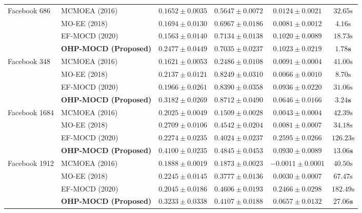 \documentclass{svproc}
\begin{document}
\begin{table}[t]
{\begin{tabular}{@{}llcccc@{}}
\midrule
Facebook 686 & MCMOEA (2016) & $0.1652 \pm 0.0035$ & $0.5647 \pm 0.0072$ & $0.0124 \pm 0.0021$ & $32.65\text{s}$ \\
 & MO-EE (2018) & $0.1694 \pm 0.0130$ & $0.6967 \pm 0.0186$ & $0.0081 \pm 0.0012$ & $4.16\text{s}$ \\
 & EF-MOCD (2020) & $0.1563 \pm 0.0140$ & $\mathbf{0.7134 \pm 0.0138}$ & $0.1020 \pm 0.0089$ & $18.73\text{s}$ \\
 & \textbf{OHP-MOCD (Proposed)} & $\mathbf{0.2477 \pm 0.0449}$ & $0.7035 \pm 0.0237$ & $\mathbf{0.1023 \pm 0.0219}$ & $\mathbf{1.78\text{s}}$ \\
\midrule
Facebook 348 & MCMOEA (2016) & $0.1621 \pm 0.0053$ & $0.2486 \pm 0.0108$ & $0.0091 \pm 0.0004$ & $41.00\text{s}$ \\
 & MO-EE (2018) & $0.2137 \pm 0.0121$ & $0.8249 \pm 0.0310$ & $0.0066 \pm 0.0010$ & $8.70\text{s}$ \\
 & EF-MOCD (2020) & $0.1966 \pm 0.0261$ & $0.8390 \pm 0.0358$ & $\mathbf{0.0936 \pm 0.0220}$ & $31.06\text{s}$ \\
 & \textbf{OHP-MOCD (Proposed)} & $\mathbf{0.3182 \pm 0.0269}$ & $\mathbf{0.8712 \pm 0.0490}$ & $0.0646 \pm 0.0166$ & $\mathbf{3.24\text{s}}$ \\
\midrule
Facebook 1684 & MCMOEA (2016) & $0.2025 \pm 0.0049$ & $0.1509 \pm 0.0028$ & $0.0043 \pm 0.0004$ & $42.39\text{s}$ \\
 & MO-EE (2018) & $0.2709 \pm 0.0106$ & $0.4542 \pm 0.0204$ & $0.0081 \pm 0.0007$ & $34.18\text{s}$ \\
 & EF-MOCD (2020) & $0.2274 \pm 0.0235$ & $0.4024 \pm 0.0237$ & $\mathbf{0.2595 \pm 0.0266}$ & $126.23\text{s}$ \\
 & \textbf{OHP-MOCD (Proposed)} & $\mathbf{0.4100 \pm 0.0235}$ & $\mathbf{0.4845 \pm 0.0453}$ & $0.0930 \pm 0.0089$ & $\mathbf{13.06\text{s}}$ \\
\midrule
Facebook 1912 & MCMOEA (2016) & $0.1888 \pm 0.0019$ & $0.1873 \pm 0.0023$ & $-0.0011 \pm 0.0001$ & $40.50\text{s}$ \\
 & MO-EE (2018) & $0.2245 \pm 0.0145$ & $0.3777 \pm 0.0136$ & $0.0030 \pm 0.0007$ & $67.47\text{s}$ \\
 & EF-MOCD (2020) & $0.2045 \pm 0.0186$ & $\mathbf{0.4606 \pm 0.0193}$ & $\mathbf{0.2466 \pm 0.0298}$ & $182.49\text{s}$ \\
 & \textbf{OHP-MOCD (Proposed)} & $\mathbf{0.3233 \pm 0.0338}$ & $0.4107 \pm 0.0188$ & $0.0657 \pm 0.0132$ & $\mathbf{27.06\text{s}}$ \\

\end{tabular}}
\end{table}
\end{document}
